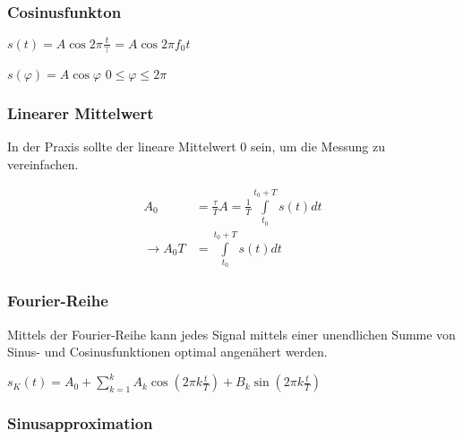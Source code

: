 \begin{multicols}{2}
\subsubsection{Cosinusfunkton}
	$s(t) = A \cos{2 \pi \frac{t}{\top}} = A \cos{2 \pi f_0 t}$
	

	
	
	$s(\varphi) = A \cos{\varphi}$
	$0 \leq \varphi \le 2 \pi$
	

\subsubsection{Linearer Mittelwert}

	In der Praxis sollte der lineare Mittelwert 0 sein, um die Messung zu vereinfachen.

	\begin{align*}
		A_0 &= \frac{\tau}{T} A = \frac{1}{T} \int\limits_{t_0}^{t_0 + T}{s(t) dt} \\
		\to A_0 T &=  \int\limits_{t_0}^{t_0 + T}{s(t) dt}
	\end{align*}

\subsubsection{Fourier-Reihe}

	Mittels der Fourier-Reihe kann jedes Signal mittels einer unendlichen Summe von Sinus- und Cosinusfunktionen optimal angenähert werden.

	$s_K(t) = A_0 + \sum^k_{k=1}{A_k \cos{(2 \pi k \frac{t}{T})} + B_k \sin{(2 \pi k \frac{t}{T})}}$


\subsubsection{Sinusapproximation}

\end{multicols}


